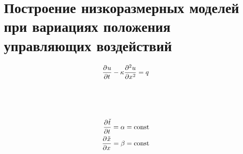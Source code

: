 \chapter{Построение низкоразмерных моделей при вариациях положения управляющих воздействий}\label{ch:ch3}


\begin{equation}
    \deriv{u}{t} - \kappa \deriv[2]{u}{x} = q
\end{equation}

\begin{figure}[ht]
    \caption{~\cite{Elizarev2022}}\label{fig:q-deviation}
\end{figure}

\begin{figure}[ht]
    \caption{~\cite{Elizarev2022}}\label{fig:q-diff}
\end{figure}

\begin{align}
    \deriv{\check{t}}{t} = \alpha = \text{const} \\
    \deriv{\check{x}}{x} = \beta = \text{const} \\
\end{align}

